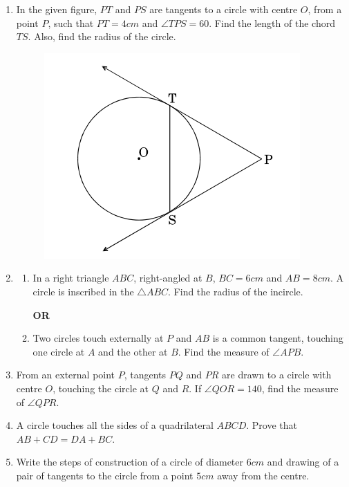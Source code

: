 \documentclass{article}
\begin{document}
\begin{enumerate}
	\item In the given figure, $PT$ and $PS$ are tangents to a circle with centre $O$, from a point $P$, such that $PT = 4 cm$ and $\angle TPS = 60$\textdegree. Find the length of the chord $TS$. Also, find the radius of the circle.
		\begin{figure}[h]
			\centering
			\includegraphics[scale=0.8]{fig3.png}
			\label{fig:my_label}
		\end{figure}
	\item \begin{enumerate}[label=(\alph*)]
			\item In a right triangle $ABC$, right-angled at $B$, $BC = 6 cm$ and $AB = 8 cm$. A circle is inscribed in the $\triangle ABC$. Find the radius of the incircle.
			\begin{center}
				\textbf{OR}
			\end{center}
			\item Two circles touch externally at $P$ and $AB$ is a common tangent, touching one circle at $A$ and the other at $B$. Find the measure of $\angle APB$.
		\end{enumerate}
	\item From an external point $P$, tangents $PQ$ and $PR$ are drawn to a circle with centre $O$, touching the circle at $Q$ and $R$. If $\angle QOR = 140$\textdegree, find the measure of $\angle QPR$.
	\item A circle touches all the sides of a quadrilateral $ABCD$. Prove that $AB + CD = DA + BC$.
	\item Write the steps of construction of a circle of diameter $6 cm$ and drawing of a pair of tangents to the circle from a point $5 cm$ away from the centre.
\end{enumerate}
\end{document}
